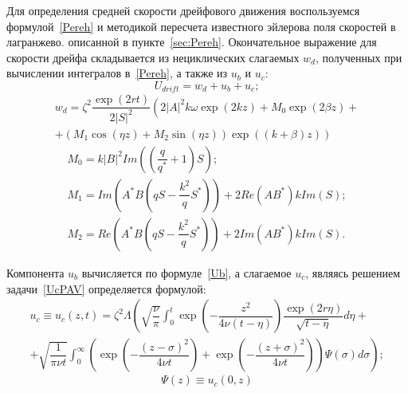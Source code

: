 Для определения средней скорости дрейфового движения воспользуемся формулой~\eqref{Pereh} и методикой пересчета известного эйлерова поля скоростей в лагранжево. описанной в пункте~\ref{sec:Pereh}. Окончательное выражение для скорости дрейфа складывается из нециклических слагаемых $ w_{d} $, полученных при вычислении интегралов в~\eqref{Pereh}, а также из  $ u_{b} $ и  $ u_{c} $:
\begin{equation}
U_{drift}=w_{d}+u_{b}+u_{c};
\label{UdriftPAV}
\end{equation}
\begin{multline}
w_{d}= \zeta^{2} \dfrac{\exp \left( 2 r t \right)}{2 \vert S \vert^{2}}\left( 2 \vert A \vert^{2} k \omega \exp \left( 2 k z \right)+ M_{0} \exp \left( 2 \beta z \right) +\right.\\
\left.+\left( M_{1}\cos \left( \eta z \right) +M_{2} \sin \left( \eta z \right) \right) \exp \left( \left( k+\beta \right) z \right) \right)
\label{wdPAV}
\end{multline}
\begin{gather*}
M_{0}= k \vert B \vert^{2} Im \left( \left( \dfrac{q}{q^{*}}+1 \right) S \right);\\
M_{1}=Im \left( A^{*} B \left( q S - \dfrac{k^{2}}{q}S^{*} \right) \right)+2 Re \left( A B^{*} \right) k Im \left( S \right);\\
M_{2}=Re\left( A^{*} B \left( q S - \dfrac{k^{2}}{q}S^{*} \right) \right) + 2 Im \left( A B^{*} \right) k Im \left( S \right).
\end{gather*}

Компонента $ u_{b} $ вычисляется по  формуле~\eqref{Ub}, а слагаемое $ u_{c} $, являясь решением задачи~\eqref{UcPAV} определяется формулой:
\begin{multline}
u_{c} \equiv u_{c} \left( z, t \right) = \zeta^{2} \Lambda \left( \sqrt{\dfrac{\nu}{\pi}} \int_{0}^{t} \exp \left( - \dfrac{z^{2}}{4 \nu \left( t - \eta \right)} \right) \dfrac{\exp \left( 2 r \eta \right)}{\sqrt{t - \eta}}d \eta +\right.\\
\left. + \sqrt{\dfrac{1}{\pi \nu t}} \int_{0}^{\infty} \left( \exp \left( -\dfrac{\left( z - \sigma \right)^{2}}{4 \nu t} \right) + \exp \left( -\dfrac{\left( z + \sigma \right)^{2}}{4 \nu t} \right) \right) \Psi \left( \sigma \right) d \sigma\right);
\label{UcYavVid}
\end{multline}
\begin{equation*}
\Psi \left( z \right) \equiv u_{c}\left( 0, z \right)
\end{equation*}

